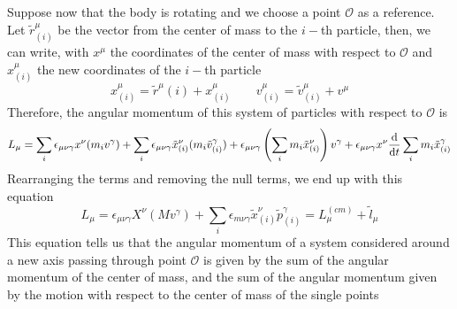 \documentclass[../admech.tex]{subfiles}
\begin{document}
Suppose now that the body is rotating and we choose a point $\mathcal{O}$ as a reference.\\
Let $\tilde{r}^\mu_{(i)}$ be the vector from the center of mass to the $i-$th particle, then, we can write, with $x^\mu$ the coordinates of the center of mass with respect to $\mathcal{O}$ and $x^\mu_{(i)}$ the new coordinates of the $i-$th particle
\begin{equation*}
	x^\mu_{(i)}=\tilde{r}^\mu{(i)}+x^\mu_{(i)}\qquad v^\mu_{(i)}=\tilde{v}^\mu_{(i)}+v^\mu
\end{equation*}
Therefore, the angular momentum of this system of particles with respect to $\mathcal{O}$ is
\begin{equation*}
	L_\mu=\sum_i\epsilon_{\mu\nu\gamma}x^\nu(m_iv^\gamma)+\sum_{i}^{}\epsilon_{\mu\nu\gamma}\tilde{x}^\nu_{(i)}(m_i\tilde{v}^\gamma_{(i)})+\epsilon_{\mu\nu\gamma}\left( \sum_{i}^{}m_i\tilde{x}_{(i)}^\nu \right)v^\gamma+\epsilon_{\mu\nu\gamma}x^\nu\dv{t}\sum_{i}^{}m_i\tilde{x}^\gamma_{(i)}
\end{equation*}
Rearranging the terms and removing the null terms, we end up with this equation
\begin{equation}
	L_\mu=\epsilon_{\mu\nu\gamma}X^\nu(Mv^\gamma)+\sum_i\epsilon_{m\nu\gamma}\tilde{x}_{(i)}^\nu\tilde{p}_{(i)}^\gamma=L_\mu^{(cm)}+\tilde{l}_\mu
	\label{eq:angmompointo}
\end{equation}
This equation tells us that the angular momentum of a system considered around a new axis passing through point $\mathcal{O}$ is given by the sum of the angular momentum of the center of mass, and the sum of the angular momentum given by the motion with respect to the center of mass of the single points
\end{document}
